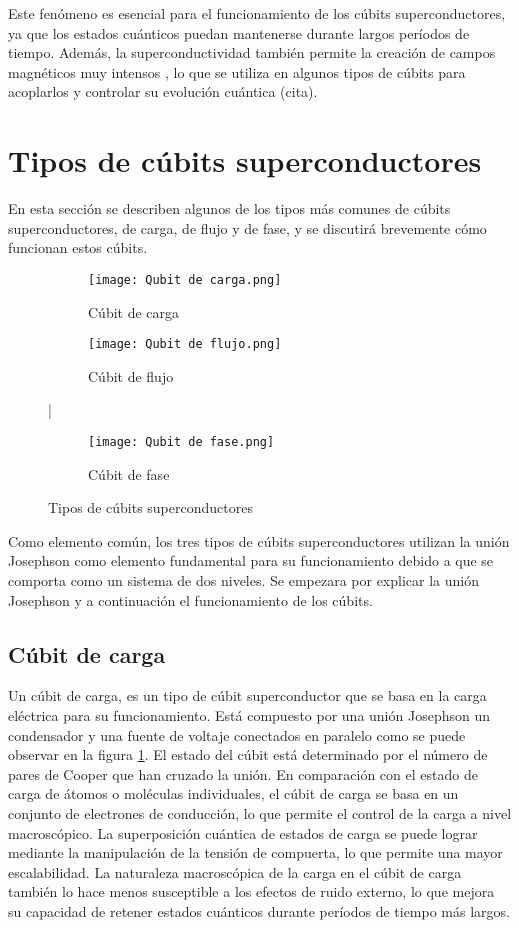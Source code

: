 \documentclass[11pt]{article}
\begin{document}
Este fenómeno es esencial para el funcionamiento de los cúbits superconductores, ya que los estados cuánticos puedan mantenerse durante largos períodos de tiempo. Además, la superconductividad también permite la creación de campos magnéticos muy intensos \citep{tyler_measurements_2004}, lo que se utiliza en algunos tipos de cúbits para acoplarlos y controlar su evolución cuántica (cita).

\section{Tipos de cúbits superconductores}
En esta sección se describen algunos de los tipos más comunes de cúbits superconductores, de carga, de flujo y de fase, y se discutirá brevemente cómo funcionan estos cúbits.

\begin{figure}[ht]
  \centering
  \begin{subfigure}[b]{0.25\textwidth}
    \texttt{[image: Qubit de carga.png]}
    \caption{Cúbit de carga }
    \label{fig:Cúbit de carga}
  \end{subfigure}
  \begin{subfigure}[b]{0.25\textwidth}
    \texttt{[image: Qubit de flujo.png]}
    \caption{Cúbit de flujo}
    \label{fig:Cúbit de flujo}
  \end{subfigure}
  |\begin{subfigure}[b]{0.25\textwidth}
    \texttt{[image: Qubit de fase.png]}
    \caption{Cúbit de fase}
    \label{fig:Cúbit de fase}
  \end{subfigure}
  \caption{Tipos de cúbits superconductores \citep{gu_microwave_2017} }
\end{figure}
Como elemento común, los tres tipos de cúbits superconductores utilizan la unión Josephson como elemento fundamental para su funcionamiento debido a que se comporta como un sistema de dos niveles. Se empezara por explicar la unión Josephson y a continuación el funcionamiento de los cúbits.

\subsection{Cúbit de carga}
Un cúbit de carga, es un tipo de cúbit superconductor que se basa en la carga eléctrica para su funcionamiento. Está compuesto por una unión Josephson un condensador y una fuente de voltaje conectados en paralelo como se puede observar en la figura \ref{fig:Cúbit de carga}.
El estado del cúbit está determinado por el número de pares de Cooper que han cruzado la unión. En comparación con el estado de carga de átomos o moléculas individuales, el cúbit de carga se basa en un conjunto de electrones de conducción, lo que permite el control de la carga a nivel macroscópico. La superposición cuántica de estados de carga se puede lograr mediante la manipulación de la tensión de compuerta, lo que permite una mayor escalabilidad. La naturaleza macroscópica de la carga en el cúbit de carga también lo hace menos susceptible a los efectos de ruido externo, lo que mejora su capacidad de retener estados cuánticos durante períodos de tiempo más largos.
\end{document}
